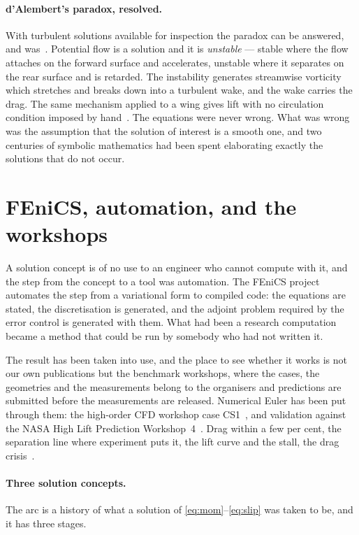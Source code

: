 \documentclass[11pt]{article}
\begin{document}
\paragraph{d'Alembert's paradox, resolved.} With turbulent solutions available for inspection the
paradox can be answered, and was~\cite{dalembert}. Potential flow is a solution and it is
\emph{unstable} --- stable where the flow attaches on the forward surface and accelerates, unstable
where it separates on the rear surface and is retarded. The instability generates streamwise
vorticity which stretches and breaks down into a turbulent wake, and the wake carries the drag. The
same mechanism applied to a wing gives lift with no circulation condition imposed by
hand~\cite{flight}. The equations were never wrong. What was wrong was the assumption that the
solution of interest is a smooth one, and two centuries of symbolic mathematics had been spent
elaborating exactly the solutions that do not occur.

\section{FEniCS, automation, and the workshops}\label{sec:fenics}

A solution concept is of no use to an engineer who cannot compute with it, and the step from the
concept to a tool was automation. The FEniCS project~\cite{fenics} automates the step from a
variational form to compiled code: the equations are stated, the discretisation is generated, and the
adjoint problem required by the error control is generated with them. What had been a research
computation became a method that could be run by somebody who had not written it.

The result has been taken into use, and the place to see whether it works is not our own publications
but the benchmark workshops, where the cases, the geometries and the measurements belong to the
organisers and predictions are submitted before the measurements are released. Numerical Euler has
been put through them: the high-order CFD workshop case CS1~\cite{cs1}, and validation against the
NASA High Lift Prediction Workshop~4~\cite{ifasd}. Drag within a few per cent, the separation line
where experiment puts it, the lift curve and the stall, the drag crisis~\cite{dragcrisis}.

\paragraph{Three solution concepts.} The arc is a history of what a solution of
\eqref{eq:mom}--\eqref{eq:slip} was taken to be, and it has three stages.
\end{document}
